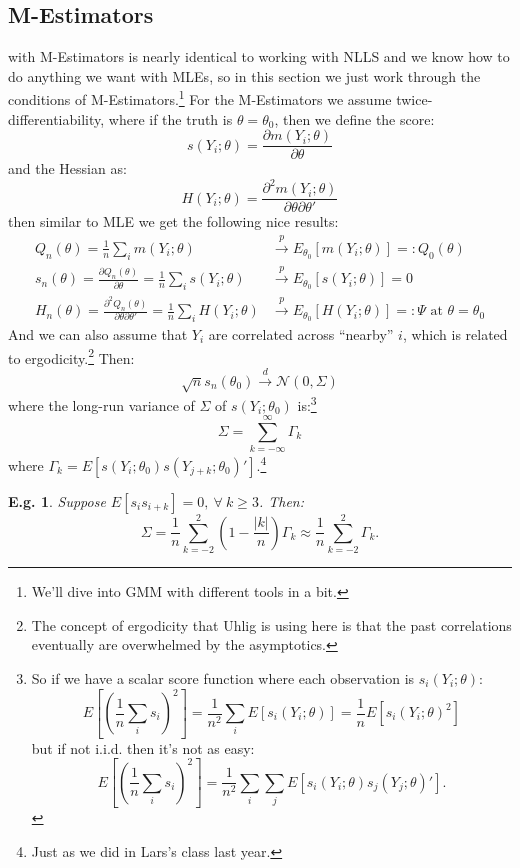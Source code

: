 \documentclass{tufte-book}
\theoremstyle{mytheoremstyle}
\theoremstyle{mylemstyle}
\theoremstyle{mydefstyle}
\newtheorem*{ex}{E.g.}
\begin{document}
\subsection{M-Estimators}
 with M-Estimators is nearly identical to working with NLLS and we know how to do anything we want with MLEs, so in this section we just work through the conditions of M-Estimators.\footnote{We'll dive into GMM with different tools in a bit.} For the M-Estimators we assume twice-differentiability, where if the truth is \(\theta = \theta_0\), then we define the score:
	\[s(Y_i; \theta) = \frac{\partial m(Y_i; \theta)}{\partial \theta}\]
and the Hessian as:
	\[H(Y_i; \theta) = \frac{\partial^2 m(Y_i; \theta)}{\partial \theta \partial \theta'}\] 
then similar to MLE we get the following nice results:
	\begin{align*}
		Q_n(\theta) = \frac{1}{n} \sum_i m(Y_i; \theta) & \overset{p}{\rightarrow} E_{\theta_0}[ m(Y_i; \theta)] =: Q_0 (\theta) \\
		s_n (\theta) = \frac{\partial Q_n(\theta)}{\partial \theta} = \frac{1}{n} \sum_i s(Y_i; \theta) & \overset{p}{\rightarrow} E_{\theta_0}[s(Y_i; \theta)] = 0 \\
		H_n(\theta) = \frac{\partial^2 Q_n(\theta)}{\partial \theta \partial \theta'} = \frac{1}{n} \sum_i H(Y_i; \theta) & \overset{p}{\rightarrow} E_{\theta_0} [H(Y_i; \theta)] =: \Psi \text{ at } \theta = \theta_0
	\end{align*}
And we can also assume that \(Y_i\) are correlated across ``nearby'' \(i\), which is related to ergodicity.\footnote{The concept of ergodicity that Uhlig is using here is that the past correlations eventually are overwhelmed by the asymptotics.} Then:
	\[\sqrt{n} s_n(\theta_0) \overset{d}{\rightarrow} \mathcal{N}(0, \Sigma)\]
where the long-run variance of \(\Sigma\) of \(s(Y_i; \theta_0)\) is:\footnote{So if we have a scalar score function where each observation is \(s_i(Y_i; \theta)\):
	\[E\left[ \left(\frac{1}{n} \sum_i s_i\right)^2 \right] = \frac{1}{n^2} \sum_i E[s_i(Y_i; \theta)] = \frac{1}{n}E[s_i(Y_i; \theta)^2]\]
but if not i.i.d. then it's not as easy:
	\[E\left[ \left(\frac{1}{n} \sum_i s_i\right)^2 \right] = \frac{1}{n^2} \sum_i \sum_j E[s_i(Y_i; \theta) s_j(Y_j; \theta)'] \text{.}\]
}
	\[\Sigma = \sum_{k=-\infty}^\infty \Gamma_k\]
where \(\Gamma_k = E[s(Y_i; \theta_0) s(Y_{j+k}; \theta_0)']\).\footnote{Just as we did in Lars's class last year.} 

\begin{ex} Suppose \(E[s_i s_{i+k}] = 0,\ \forall\ k\ge 3\). Then:
	\[\Sigma = \frac{1}{n}\sum_{k=-2}^2 \left(1-\frac{|k|}{n}\right) \Gamma_k \approx \frac{1}{n} \sum_{k=-2}^2 \Gamma_k \text{.}\]
\end{ex}
\end{document}
